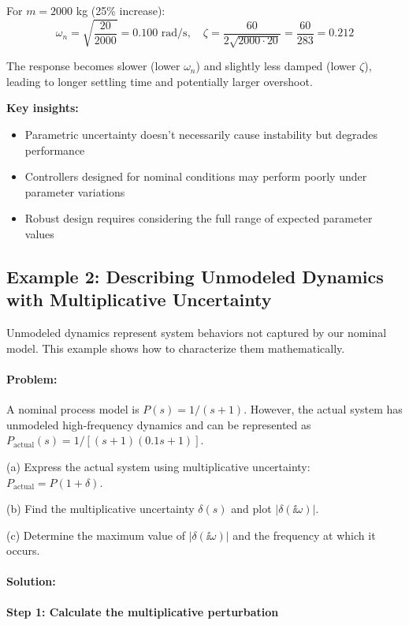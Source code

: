 \documentclass[11pt,a4paper]{article}
\begin{document}
For $m = 2000$ kg (25\% increase):
\begin{equation}
  \omega_n = \sqrt{\frac{20}{2000}} = 0.100 \text{ rad/s}, \quad \zeta = \frac{60}{2\sqrt{2000 \cdot 20}} = \frac{60}{283} = 0.212
\end{equation}

The response becomes slower (lower $\omega_n$) and slightly less damped (lower $\zeta$), leading to longer settling time and potentially larger overshoot.

\textbf{Key insights:}
\begin{itemize}
  \item Parametric uncertainty doesn't necessarily cause instability but degrades performance
  \item Controllers designed for nominal conditions may perform poorly under parameter variations
  \item Robust design requires considering the full range of expected parameter values
\end{itemize}

\subsection{Example 2: Describing Unmodeled Dynamics with Multiplicative Uncertainty}

Unmodeled dynamics represent system behaviors not captured by our nominal model. This example shows how to characterize them mathematically.

\paragraph{Problem:}
A nominal process model is $P(s) = 1/(s+1)$. However, the actual system has unmodeled high-frequency dynamics and can be represented as $P_{\text{actual}}(s) = 1/[(s+1)(0.1s+1)]$.

(a) Express the actual system using multiplicative uncertainty: $P_{\text{actual}} = P(1 + \delta)$.

(b) Find the multiplicative uncertainty $\delta(s)$ and plot $|\delta(\ii\omega)|$.

(c) Determine the maximum value of $|\delta(\ii\omega)|$ and the frequency at which it occurs.

\paragraph{Solution:}

\textbf{Step 1: Calculate the multiplicative perturbation}
\end{document}
